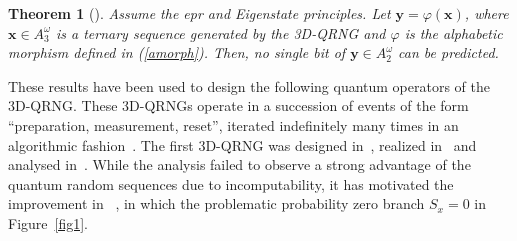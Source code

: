\documentclass[l1pt]{elsarticle}
\newtheorem{theorem}{Theorem}
\newcommand{\y}{\mathbf{y}}
\begin{document}
{  \begin{theorem}[\cite{aguero_trejo_new_2021}]
        Assume the epr and Eigenstate principles. Let $\mathbf{y}=\varphi (\mathbf{x})$, where $\mathbf{x}\in A_3^{\omega}$ is a ternary sequence generated by the  {\rm 3D-QRNG}  and $\varphi$ is the alphabetic morphism defined in (\ref{amorph}).
Then, no single bit of    $\y \in A_2^{\omega}$  can be predicted.
\end{theorem}




These results have been used to design the following quantum operators of the 3D-QRNG.  These 3D-QRNGs operate in a succession of events of the form ``preparation,  measurement,
 reset'', iterated indefinitely many times in an algorithmic fashion~\cite{abbott2012strongrandomness}. The first 3D-QRNG was designed in~\cite{abbott2012strongrandomness}, realized in~\cite{PhysRevLett.119.240501} and analysed in~\cite{abbott2018experimentally}. While the analysis failed to observe a strong advantage of the quantum random sequences due to incomputability, it has motivated the improvement in ~\cite{aguero_trejo_new_2021}, in which the problematic probability zero branch  $S_x=0$  in Figure~\ref{fig1}.

}
\end{document}
